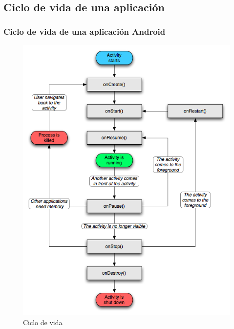 \documentclass[xcolor={dvipsnames}]{beamer}
\begin{document}
\subsection{Ciclo de vida de una aplicación}
\begin{frame}[plain]\frametitle{Ciclo de vida de una aplicación Android}
    \begin{figure}
    \includegraphics[scale=0.3]{images/activity_lifecycle} 
    \caption{Ciclo de vida}
    \end{figure}
\end{frame}
\end{document}
